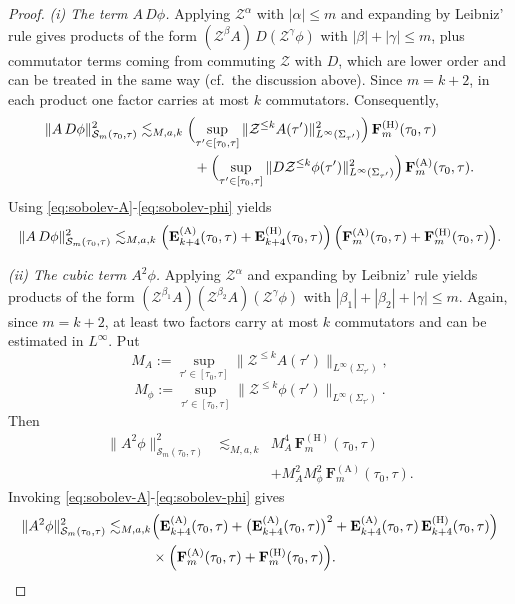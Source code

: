 \documentclass[11pt]{article}
\numberwithin{equation}{section}
\theoremstyle{plain}
\theoremstyle{definition}
\theoremstyle{remark}
\begin{document}
\begin{proof}
\smallskip\noindent
\emph{(i) The term $A\,D\phi$.}
Applying $\mathcal Z^\alpha$ with $|\alpha|\le m$ and expanding by Leibniz' rule gives products of the form
$(\mathcal Z^{\beta}A)\,D(\mathcal Z^{\gamma}\phi)$ with $|\beta|+|\gamma|\le m$, plus commutator terms coming from commuting $\mathcal Z$ with $D$, which are lower order and can be treated in the same way (cf.\ the discussion above).
Since $m=k+2$, in each product one factor carries at most $k$ commutators.
Consequently,
\begin{eqnarray}
\|A\,D\phi\|_{\mathcal S_{m}(\tau_0,\tau)}^{2}
&\lesssim_{M,a,k}
\Bigl(
\sup_{\tau'\in[\tau_0,\tau]}\|\mathcal Z^{\le k}A(\tau')\|_{L^\infty(\Sigma_{\tau'})}^{2}
\Bigr)\,
\mathbf F_{m}^{(\mathrm H)}(\tau_0,\tau)\nonumber\\
&\qquad\qquad+
\Bigl(
\sup_{\tau'\in[\tau_0,\tau]}\|D\mathcal Z^{\le k}\phi(\tau')\|_{L^\infty(\Sigma_{\tau'})}^{2}
\Bigr)\,
\mathbf F_{m}^{(\mathrm A)}(\tau_0,\tau).
\label{eq:term-ADphi}
\end{eqnarray}
Using \eqref{eq:sobolev-A}-\eqref{eq:sobolev-phi} yields
\begin{equation}\label{eq:term-ADphi-simplified}
\|A\,D\phi\|_{\mathcal S_{m}(\tau_0,\tau)}^{2}
\lesssim_{M,a,k}
\Bigl(\mathbf E_{k+4}^{(\mathrm A)}(\tau_0,\tau)+\mathbf E_{k+4}^{(\mathrm H)}(\tau_0,\tau)\Bigr)\,
\Bigl(\mathbf F_{m}^{(\mathrm A)}(\tau_0,\tau)+\mathbf F_{m}^{(\mathrm H)}(\tau_0,\tau)\Bigr).
\end{equation}

\smallskip\noindent
\emph{(ii) The cubic term $A^{2}\phi$.}
Applying $\mathcal Z^\alpha$ and expanding by Leibniz' rule yields products of the form
$(\mathcal Z^{\beta_1}A)(\mathcal Z^{\beta_2}A)(\mathcal Z^{\gamma}\phi)$ with $|\beta_1|+|\beta_2|+|\gamma|\le m$.
Again, since $m=k+2$, at least two factors carry at most $k$ commutators and can be estimated in $L^\infty$.
Put
\begin{equation}
M_A:=\sup_{\tau'\in[\tau_0,\tau]}
\|\mathcal Z^{\le k}A(\tau')\|_{L^\infty(\Sigma_{\tau'})},
\end{equation}
\begin{equation}
M_\phi:=\sup_{\tau'\in[\tau_0,\tau]}
\|\mathcal Z^{\le k}\phi(\tau')\|_{L^\infty(\Sigma_{\tau'})}.
\end{equation}
Then
\begin{eqnarray}\label{eq:term-A2phi}
\|A^{2}\phi\|_{\mathcal S_{m}(\tau_0,\tau)}^{2}
&\lesssim_{M,a,k}&
M_A^{4}\,\mathbf F_{m}^{(\mathrm H)}(\tau_0,\tau)
\nonumber\\
&&+M_A^{2}M_\phi^{2}\,\mathbf F_{m}^{(\mathrm A)}(\tau_0,\tau).
\end{eqnarray}
Invoking \eqref{eq:sobolev-A}-\eqref{eq:sobolev-phi} gives
\begin{eqnarray}\label{eq:term-A2phi-simplified}
\|A^{2}\phi\|_{\mathcal S_{m}(\tau_0,\tau)}^{2}
\lesssim_{M,a,k}
&\Bigl(
\mathbf E_{k+4}^{(\mathrm A)}(\tau_0,\tau)
+\bigl(\mathbf E_{k+4}^{(\mathrm A)}(\tau_0,\tau)\bigr)^{2}
+\mathbf E_{k+4}^{(\mathrm A)}(\tau_0,\tau)\,\mathbf E_{k+4}^{(\mathrm H)}(\tau_0,\tau)
\Bigr)\\
&\times
\Bigl(\mathbf F_{m}^{(\mathrm A)}(\tau_0,\tau)+\mathbf F_{m}^{(\mathrm H)}(\tau_0,\tau)\Bigr).
\end{eqnarray}


\end{proof}
\end{document}
